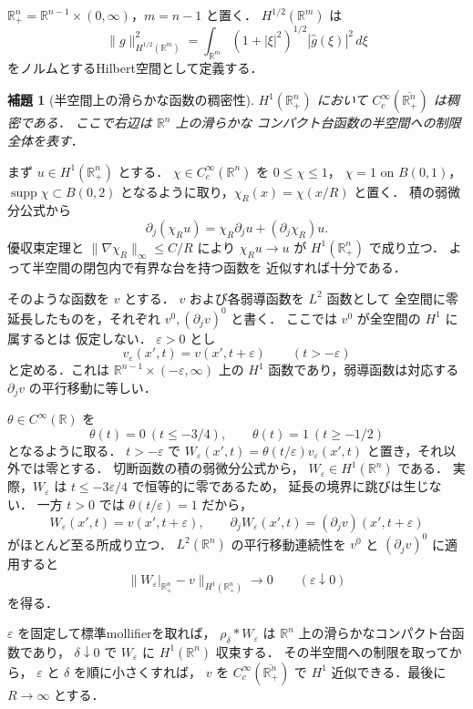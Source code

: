 \documentclass[a5paper,10pt,onecolumn]{jsarticle}
\makeatletter
\theoremstyle{mathnotetheorem}
\newtheorem{lemma}[theorem]{補題}
\renewcommand{\proofname}{証明}
\renewenvironment{proof}[1][\proofname]{%
  \par\pushQED{\qed}\normalfont\topsep4\p@\@plus2\p@\relax
  \trivlist\item[\hskip\labelsep\bfseries #1]\ignorespaces
}{\popQED\endtrivlist\@endpefalse}
\newcommand{\norm}[1]{\lVert #1\rVert}
\makeatother
\begin{document}
$\mathbb R^n_+=\mathbb R^{n-1}\times(0,\infty)$，$m=n-1$ と置く．
$H^{1/2}(\mathbb R^m)$ は
\[
 \norm g_{H^{1/2}(\mathbb R^m)}^2
 =\int_{\mathbb R^m}(1+|\xi|^2)^{1/2}|\widehat g(\xi)|^2\,d\xi
\]
をノルムとするHilbert空間として定義する．

\begin{lemma}[半空間上の滑らかな函数の稠密性]
\label{lem:halfspace-density}
$H^1(\mathbb R^n_+)$ において
$C_c^\infty(\overline{\mathbb R^n_+})$ は稠密である．
ここで右辺は $\mathbb R^n$ 上の滑らかな
コンパクト台函数の半空間への制限全体を表す．
\end{lemma}
\begin{proof}
まず $u\in H^1(\mathbb R^n_+)$ とする．
$\chi\in C_c^\infty(\mathbb R^n)$ を
$0\le\chi\le1$，
$\chi=1$ on $B(0,1)$，
$\operatorname{supp}\chi\subset B(0,2)$
となるように取り，$\chi_R(x)=\chi(x/R)$ と置く．
積の弱微分公式から
\[
 \partial_j(\chi_Ru)
 =\chi_R\partial_ju+(\partial_j\chi_R)u .
\]
優収束定理と
$\norm{\nabla\chi_R}_\infty\le C/R$ により
$\chi_Ru\to u$ が $H^1(\mathbb R^n_+)$ で成り立つ．
よって半空間の閉包内で有界な台を持つ函数を
近似すれば十分である．

そのような函数を $v$ とする．
$v$ および各弱導函数を $L^2$ 函数として
全空間に零延長したものを，それぞれ
$v^0,(\partial_jv)^0$ と書く．
ここでは $v^0$ が全空間の $H^1$ に属するとは
仮定しない．
$\varepsilon>0$ とし
\[
 v_\varepsilon(x',t)=v(x',t+\varepsilon)
 \qquad(t>-\varepsilon)
\]
と定める．これは
$\mathbb R^{n-1}\times(-\varepsilon,\infty)$ 上の
$H^1$ 函数であり，弱導函数は対応する
$\partial_jv$ の平行移動に等しい．

$\theta\in C^\infty(\mathbb R)$ を
\[
 \theta(t)=0\ (t\le-3/4),\qquad
 \theta(t)=1\ (t\ge-1/2)
\]
となるように取る．
$t>-\varepsilon$ で
$W_\varepsilon(x',t)=\theta(t/\varepsilon)
 v_\varepsilon(x',t)$ と置き，それ以外では零とする．
切断函数の積の弱微分公式から，
$W_\varepsilon\in H^1(\mathbb R^n)$ である．
実際，$W_\varepsilon$ は
$t\le-3\varepsilon/4$ で恒等的に零であるため，
延長の境界に跳びは生じない．
一方 $t>0$ では $\theta(t/\varepsilon)=1$ だから，
\[
 W_\varepsilon(x',t)=v(x',t+\varepsilon),\qquad
 \partial_jW_\varepsilon(x',t)
 =(\partial_jv)(x',t+\varepsilon)
\]
がほとんど至る所成り立つ．
$L^2(\mathbb R^n)$ の平行移動連続性を
$v^0$ と $(\partial_jv)^0$ に適用すると
\[
 \norm{W_\varepsilon|_{\mathbb R^n_+}-v}
       _{H^1(\mathbb R^n_+)}
 \longrightarrow0
 \qquad(\varepsilon\downarrow0)
\]
を得る．

$\varepsilon$ を固定して標準mollifierを取れば，
$\rho_\delta*W_\varepsilon$ は
$\mathbb R^n$ 上の滑らかなコンパクト台函数であり，
$\delta\downarrow0$ で $W_\varepsilon$ に
$H^1(\mathbb R^n)$ 収束する．
その半空間への制限を取ってから，
$\varepsilon$ と $\delta$ を順に小さくすれば，
$v$ を $C_c^\infty(\overline{\mathbb R^n_+})$ で
$H^1$ 近似できる．最後に $R\to\infty$ とする．
\end{proof}
\end{document}
